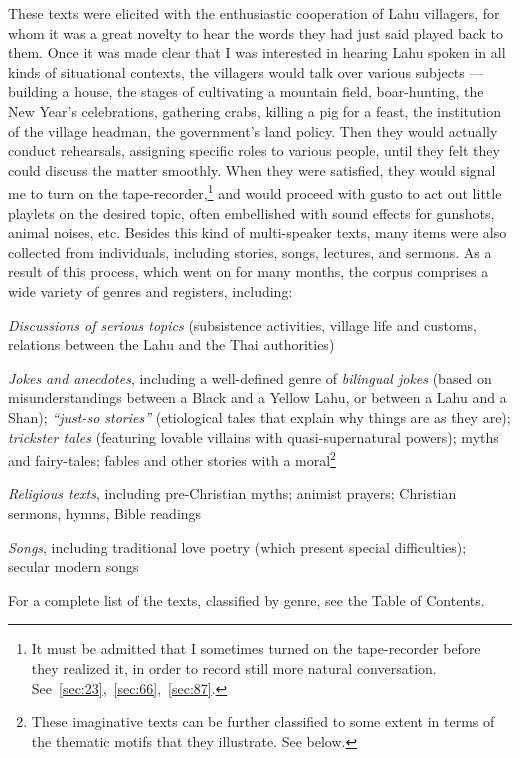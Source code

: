 These texts were elicited with the enthusiastic cooperation of Lahu
villagers, for whom it was a great novelty to hear the words they had
just said played back to them. Once it was made clear that I was
interested in hearing Lahu spoken in all kinds of situational
contexts, the villagers would talk over various subjects --- building a
house, the stages of cultivating a mountain field, boar-hunting, the
New Year's celebrations, gathering crabs, killing a pig for a feast,
the institution of the village headman, the government's land
policy. Then they would actually conduct rehearsals, assigning
specific roles to various people, until they felt they could discuss
the matter smoothly.  When they were satisfied, they would signal me
to turn on the tape-recorder,\footnote{It must be admitted that I
  sometimes turned on the tape-recorder before they realized it, in
  order to record still more natural
  conversation. See~\ref{sec:23},~\ref{sec:66},~\ref{sec:87}.} and
would proceed with gusto to act out little playlets on the desired
topic, often embellished with sound effects for gunshots, animal
noises, etc. Besides this kind of multi-speaker texts, many items were
also collected from individuals, including stories, songs, lectures,
and sermons. As a result of this process, which went on for many
months, the corpus comprises a wide variety of genres and registers,
including:

\emph{Discussions of serious topics} (subsistence activities, village
life and customs, relations between the Lahu and the Thai authorities)

\emph{Jokes and anecdotes}, including a well-defined genre of
\emph{bilingual jokes} (based on misunderstandings between a Black and a
Yellow Lahu, or between a Lahu and a Shan); \emph{``just-so stories''}
(etiological tales that explain why things are as they are);
\emph{trickster tales} (featuring lovable villains with
quasi-supernatural powers); myths and fairy-tales; fables and other
stories with a moral\footnote{These imaginative texts
  can be further classified to some extent in terms of the thematic
  motifs that they illustrate. See below.}

\emph{Religious texts}, including pre-Christian myths; animist prayers;
Christian sermons, hymns, Bible readings

\emph{Songs}, including traditional love poetry (which present special
difficulties); secular modern songs

For a complete list of the texts, classified by genre, see the Table of
Contents.

